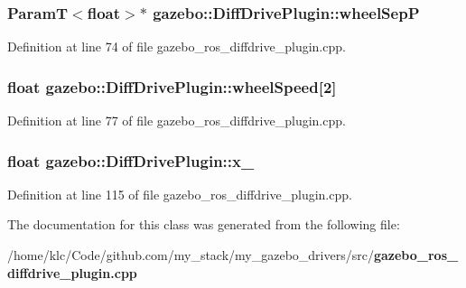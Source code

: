 \subsubsection[{wheelSepP}]{\setlength{\rightskip}{0pt plus 5cm}ParamT$<$float$>$$\ast$ {\bf gazebo::DiffDrivePlugin::wheelSepP}\hspace{0.3cm}{\ttfamily  [private]}}\label{classgazebo_1_1DiffDrivePlugin_adb819234190b3cb5a95d3c408bf73633}


Definition at line 74 of file gazebo\_\-ros\_\-diffdrive\_\-plugin.cpp.

\subsubsection[{wheelSpeed}]{\setlength{\rightskip}{0pt plus 5cm}float {\bf gazebo::DiffDrivePlugin::wheelSpeed}[2]\hspace{0.3cm}{\ttfamily  [private]}}\label{classgazebo_1_1DiffDrivePlugin_a2d1454931ce7c70633aa0773d8cbf3b3}


Definition at line 77 of file gazebo\_\-ros\_\-diffdrive\_\-plugin.cpp.

\subsubsection[{x\_\-}]{\setlength{\rightskip}{0pt plus 5cm}float {\bf gazebo::DiffDrivePlugin::x\_\-}\hspace{0.3cm}{\ttfamily  [private]}}\label{classgazebo_1_1DiffDrivePlugin_afc221c51ce76ba4d6e419047323b4e25}


Definition at line 115 of file gazebo\_\-ros\_\-diffdrive\_\-plugin.cpp.



The documentation for this class was generated from the following file:\begin{DoxyCompactItemize}
\item 
/home/klc/Code/github.com/my\_\-stack/my\_\-gazebo\_\-drivers/src/{\bf gazebo\_\-ros\_\-diffdrive\_\-plugin.cpp}\end{DoxyCompactItemize}
